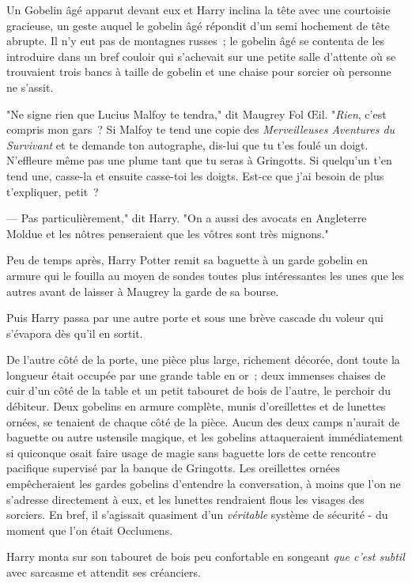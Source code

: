 Un Gobelin âgé apparut devant eux et Harry inclina la tête avec une courtoisie gracieuse, un geste auquel le gobelin âgé répondit d'un semi hochement de tête abrupte. Il n'y eut pas de montagnes russes~; le gobelin âgé se contenta de les introduire dans un bref couloir qui s'achevait sur une petite salle d'attente où se trouvaient trois bancs à taille de gobelin et une chaise pour sorcier où personne ne s'assit.

"Ne signe rien que Lucius Malfoy te tendra," dit Maugrey Fol Œil. "\emph{Rien}, c'est compris mon gars~? Si Malfoy te tend une copie des \emph{Merveilleuses Aventures du Survivant} et te demande ton autographe, dis-lui que tu t'es foulé un doigt. N'effleure même pas une plume tant que tu seras à Gringotts. Si quelqu'un t'en tend une, casse-la et ensuite casse-toi les doigts. Est-ce que j'ai besoin de plus t'expliquer, petit~?

--- Pas particulièrement," dit Harry. "On a aussi des avocats en Angleterre Moldue et les nôtres penseraient que les vôtres sont très mignons."

Peu de temps après, Harry Potter remit sa baguette à un garde gobelin en armure qui le fouilla au moyen de sondes toutes plus intéressantes les unes que les autres avant de laisser à Maugrey la garde de sa bourse.

Puis Harry passa par une autre porte et sous une brève cascade du voleur qui s'évapora dès qu'il en sortit.

De l'autre côté de la porte, une pièce plus large, richement décorée, dont toute la longueur était occupée par une grande table en or~; deux immenses chaises de cuir d'un côté de la table et un petit tabouret de bois de l'autre, le perchoir du débiteur. Deux gobelins en armure complète, munis d'oreillettes et de lunettes ornées, se tenaient de chaque côté de la pièce. Aucun des deux camps n'aurait de baguette ou autre ustensile magique, et les gobelins attaqueraient immédiatement si quiconque osait faire usage de magie sans baguette lors de cette rencontre pacifique supervisé par la banque de Gringotts. Les oreillettes ornées empêcheraient les gardes gobelins d'entendre la conversation, à moins que l'on ne s'adresse directement à eux, et les lunettes rendraient flous les visages des sorciers. En bref, il s'agissait quasiment d'un \emph{véritable} système de sécurité - du moment que l'on était Occlumens.

Harry monta sur son tabouret de bois peu confortable en songeant \emph{que c'est subtil} avec sarcasme et attendit ses créanciers.

